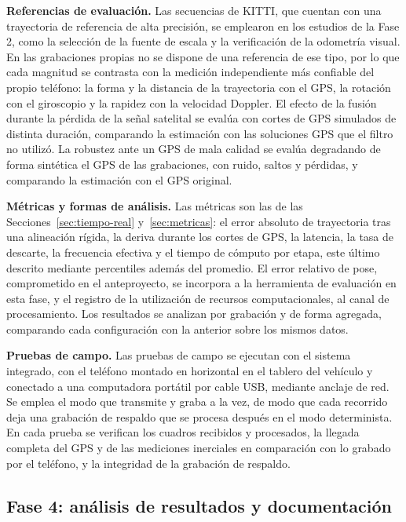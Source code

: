 \textbf{Referencias de evaluación.}
Las secuencias de KITTI, que cuentan con una trayectoria de referencia de alta precisión, se emplearon en los estudios de la Fase 2, como la selección de la fuente de escala y la verificación de la odometría visual.
En las grabaciones propias no se dispone de una referencia de ese tipo, por lo que cada magnitud se contrasta con la medición independiente más confiable del propio teléfono: la forma y la distancia de la trayectoria con el GPS, la rotación con el giroscopio y la rapidez con la velocidad Doppler.
El efecto de la fusión durante la pérdida de la señal satelital se evalúa con cortes de GPS simulados de distinta duración, comparando la estimación con las soluciones GPS que el filtro no utilizó.
La robustez ante un GPS de mala calidad se evalúa degradando de forma sintética el GPS de las grabaciones, con ruido, saltos y pérdidas, y comparando la estimación con el GPS original.

\textbf{Métricas y formas de análisis.}
Las métricas son las de las Secciones~\ref{sec:tiempo-real} y~\ref{sec:metricas}: el error absoluto de trayectoria tras una alineación rígida, la deriva durante los cortes de GPS, la latencia, la tasa de descarte, la frecuencia efectiva y el tiempo de cómputo por etapa, este último descrito mediante percentiles además del promedio.
El error relativo de pose, comprometido en el anteproyecto, se incorpora a la herramienta de evaluación en esta fase, y el registro de la utilización de recursos computacionales, al canal de procesamiento.
Los resultados se analizan por grabación y de forma agregada, comparando cada configuración con la anterior sobre los mismos datos.

\textbf{Pruebas de campo.}
Las pruebas de campo se ejecutan con el sistema integrado, con el teléfono montado en horizontal en el tablero del vehículo y conectado a una computadora portátil por cable USB, mediante anclaje de red.
Se emplea el modo que transmite y graba a la vez, de modo que cada recorrido deja una grabación de respaldo que se procesa después en el modo determinista.
En cada prueba se verifican los cuadros recibidos y procesados, la llegada completa del GPS y de las mediciones inerciales en comparación con lo grabado por el teléfono, y la integridad de la grabación de respaldo.

\subsection{Fase 4: análisis de resultados y documentación}
\label{sec:met-fase4}

